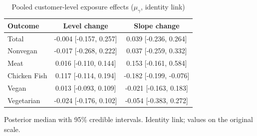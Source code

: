 \begin{table}[H]
\centering
\caption{Pooled customer-level exposure effects ($\mu_\gamma$, identity link)}
\label{tab:a5_mu_gamma}
\begin{tabular}{lcc}
\toprule
Outcome & Level change & Slope change \\
\midrule
Total & -0.004 [-0.157, 0.257] & 0.039 [-0.236, 0.264] \\
Nonvegan & -0.017 [-0.268, 0.222] & 0.037 [-0.259, 0.332] \\
Meat & 0.016 [-0.110, 0.144] & 0.153 [-0.161, 0.584] \\
Chicken Fish & 0.117 [-0.114, 0.194] & -0.182 [-0.199, -0.076] \\
Vegan & 0.013 [-0.093, 0.109] & -0.021 [-0.163, 0.183] \\
Vegetarian & -0.024 [-0.176, 0.102] & -0.054 [-0.383, 0.272] \\
\bottomrule
\end{tabular}
\par\smallskip\footnotesize Posterior median with 95\% credible intervals. Identity link; values on the original scale.
\end{table}
